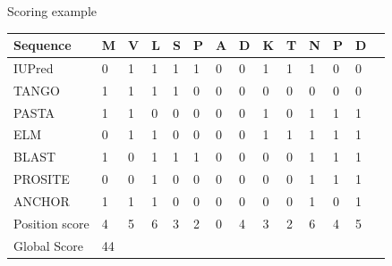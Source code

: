 \documentclass{beamer}
\begin{document}

% 
\begin{frame}{Scoring example}
 \begin{tabular}{llllllllllllll} 
\hline
\rowcolor{GrayOscuro}Sequence & \textbf{M} & \textbf{V} & \textbf{L} & \textbf{S} & \textbf{P} & \textbf{A} & \textbf{D} & \textbf{K} & \textbf{T} & \textbf{N} & \textbf{P} & \textbf{D} \\ \hline \hline
 
\rowcolor{Gray}IUPred           	& 0 & 1 & 1 & 1 & 1 & 0 & 0 & 1 & 1 & 1 & 0 & 0\\ \hline  
TANGO 		       			& 1 & 1 & 1 & 1 & 0 & 0 & 0 & 0 & 0 & 0 & 0 & 0\\ \hline  
\rowcolor{Gray}PASTA			& 1 & 1 & 0 & 0 & 0 & 0 & 0 & 1 & 0 & 1 & 1 & 1\\ \hline  
ELM          	      			& 0 & 1 & 1 & 0 & 0 & 0 & 0 & 1 & 1 & 1 & 1 & 1\\ \hline 
\rowcolor{Gray}BLAST			& 1 & 0 & 1 & 1 & 1 & 0 & 0 & 0 & 0 & 1 & 1 & 1\\ \hline 
PROSITE 	      			& 0 & 0 & 1 & 0 & 0 & 0 & 0 & 0 & 0 & 1 & 1 & 1\\ \hline 
\rowcolor{Gray}ANCHOR	        	& 1 & 1 & 1 & 0 & 0 & 0 & 0 & 0 & 0 & 1 & 0 & 1\\ \hline \hline
\rowcolor{GrayOscuro}Position score     & 4 & 5 & 6 & 3 & 2 & 0 & 4 & 3 & 2 & 6 & 4 & 5\\ \hline
\rowcolor{GrayOscuro}Global Score  & 44 &&&&&&&&&&& \\ \hline
\end{tabular}
\end{frame}
\end{document}
